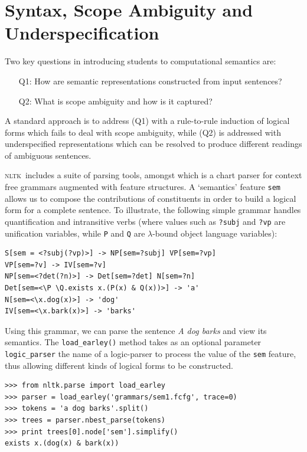 \documentclass[11pt,a4paper]{article}
\newcommand{\NLTK}{\textsc{nltk}}
\newcommand{\dhgcode}[1]{{\tt #1}}
\begin{document}
\clearpage



\section{Syntax, Scope Ambiguity and Underspecification}

Two key questions in introducing students to computational semantics are:
\begin{enumerate}
\item[Q1:] How are semantic representations constructed from input
  sentences?
\vspace{-2ex}
\item[Q2:] What is scope ambiguity and how is it captured?
\end{enumerate}
A standard approach is to address (Q1) with a rule-to-rule induction of
logical forms which fails to deal with scope ambiguity, while (Q2) is
addressed with underspecified representations
which can be resolved to produce different readings of ambiguous
sentences. 

\NLTK\ includes a suite of parsing tools, amongst which is a chart
parser for context free grammars augmented with feature structures. A
`semantics' feature \texttt{sem} allows us to compose the
contributions of constituents in order to build a logical form for a
complete sentence.  To illustrate, the following simple grammar
handles quantification and intransitive verbs (where values such as
\texttt{?subj} and \texttt{?vp} are unification variables, while
\texttt{P} and \texttt{Q} are $\lambda$-bound object language
variables):

\begin{verbatim}
S[sem = <?subj(?vp)>] -> NP[sem=?subj] VP[sem=?vp]
VP[sem=?v] -> IV[sem=?v]
NP[sem=<?det(?n)>] -> Det[sem=?det] N[sem=?n]
Det[sem=<\P \Q.exists x.(P(x) & Q(x))>] -> 'a'
N[sem=<\x.dog(x)>] -> 'dog'
IV[sem=<\x.bark(x)>] -> 'barks'
\end{verbatim}
Using this grammar, we can parse the sentence \textit{A dog barks} and view
its semantics. 
The \dhgcode{load\_earley()} method
takes as an optional parameter \dhgcode{logic\_parser} the name of a
logic-parser to process the value of the \texttt{sem} feature, thus
allowing different kinds of logical forms to be constructed.
\begin{verbatim}
>>> from nltk.parse import load_earley
>>> parser = load_earley('grammars/sem1.fcfg', trace=0)
>>> tokens = 'a dog barks'.split()
>>> trees = parser.nbest_parse(tokens)
>>> print trees[0].node['sem'].simplify()
exists x.(dog(x) & bark(x))
\end{verbatim}
\end{document}
